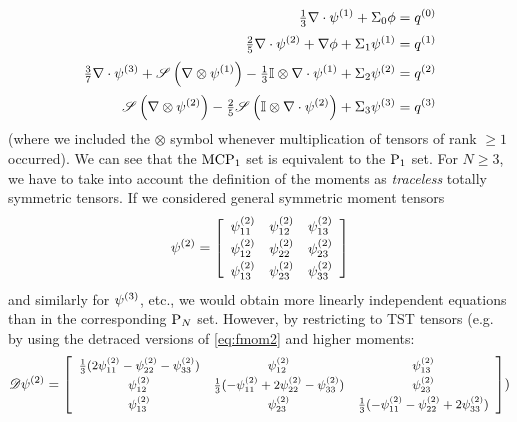 \begin{equation}\label{eq:MCP3}
	\begin{aligned}
    \tfrac{1}{3}\nabla\cdot\fmom[1] 
      +   {\Sigma}_{0}\phi
      &=  {q}^{(0)} \\[.2em]
    \tfrac{2}{5} \nabla\cdot\fmom[2] + \nabla\phi 
      +   {\Sigma}_{1}\fmom[1] 
      &=  {q}^{(1)}  \\[.2em]
    \tfrac{3}{7} \nabla\cdot\fmom[3] + \Sym{\nabla\otimes\fmom[1]} - \tfrac{1}{3} \eye\otimes\nabla\cdot\fmom[1]
      +   {\Sigma}_{2}\fmom[2]
      &=  {q}^{(2)}  \\[.2em]
                                       \Sym{\nabla\otimes\fmom[2]} - \tfrac{2}{5} \Sym{\eye\otimes\nabla\cdot\fmom[2]}
      +   {\Sigma}_{3}\fmom[3]
      &=  {q}^{(3)}
    \end{aligned}
\end{equation}
(where we included the $\otimes$
symbol whenever multiplication of tensors of rank $\geq 1$ occurred).
We can see that the $\MCPN[1]$ set is equivalent to the $\PN[1]$ set. For $N \geq 3$, we have to take into account the
definition of the moments as \textit{traceless} totally symmetric tensors. If we considered general symmetric
moment tensors 
\begin{equation}\label{eq:fmom2}
	\fmom[2] = \left[
\begin{array}{ccc}
 \fmom[2]_{11} & \fmom[2]_{12} & \fmom[2]_{13} \\[.2em]
 \fmom[2]_{12} & \fmom[2]_{22} & \fmom[2]_{23} \\[.2em]
 \fmom[2]_{13} & \fmom[2]_{23} & \fmom[2]_{33} \\
\end{array}
\right]
\end{equation}
and similarly for $\fmom[3]$, etc., we would obtain more linearly independent equations than in the corresponding $\PN$
set. However, by restricting to TST tensors (e.g. by using the detraced versions of \eqref{eq:fmom2} and higher moments:
$$
\footnotesize
\detr\fmom[2] = \left[
\begin{array}{ccc}
 \frac{1}{3} (2 \fmom[2]_{11}-\fmom[2]_{22}-\fmom[2]_{33}) & \fmom[2]_{12} & \fmom[2]_{13} \\[.2em]
 \fmom[2]_{12} & \frac{1}{3} (-\fmom[2]_{11}+2 \fmom[2]_{22}-\fmom[2]_{33}) & \fmom[2]_{23} \\[.2em]
 \fmom[2]_{13} & \fmom[2]_{23} & \frac{1}{3} (-\fmom[2]_{11}-\fmom[2]_{22}+2 \fmom[2]_{33}) \\
\end{array}
\right])
$$
